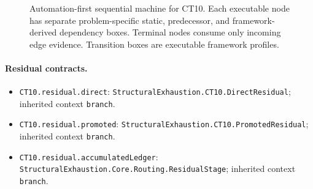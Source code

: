 \begin{landscape}
\begin{figure}[p]
\begin{adjustbox}{max totalsize={\linewidth}{0.72\textheight},center}
%
\end{adjustbox}
\caption{Automation-first sequential machine for CT10. Each executable node has separate problem-specific static, predecessor, and framework-derived dependency boxes. Terminal nodes consume only incoming edge evidence. Transition boxes are executable framework profiles.}
\label{fig:ct10-machine}
\end{figure}
\end{landscape}

\begingroup\small\sloppy
\paragraph{Residual contracts.}
\begin{itemize}
\item \texttt{CT10.\allowbreak{}residual.\allowbreak{}direct}: \texttt{Structural\allowbreak{}Exhaustion.\allowbreak{}CT10.\allowbreak{}Direct\allowbreak{}Residual}; inherited context \texttt{branch}.
\item \texttt{CT10.\allowbreak{}residual.\allowbreak{}promoted}: \texttt{Structural\allowbreak{}Exhaustion.\allowbreak{}CT10.\allowbreak{}Promoted\allowbreak{}Residual}; inherited context \texttt{branch}.
\item \texttt{CT10.\allowbreak{}residual.\allowbreak{}accumulated\allowbreak{}Ledger}: \texttt{Structural\allowbreak{}Exhaustion.\allowbreak{}Core.\allowbreak{}Routing.\allowbreak{}Residual\allowbreak{}Stage}; inherited context \texttt{branch}.
\end{itemize}
